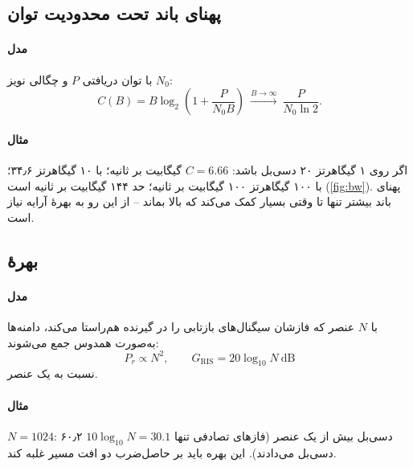 \documentclass[11pt,a4paper]{article}
\begin{document}
\begin{acnfigure}
  \caption{افت مسیر فضای آزاد (\cref{eq:fspl}).}
  \label{fig:fspl}
\end{acnfigure}

\subsection{پهنای باند تحت محدودیت توان}\label{sec:bw}
\paragraph{مدل} با توان دریافتی $P$ و چگالی نویز $N_0$:
\begin{equation}\label{eq:cap}
  C(B) = B \log_2\!\left(1 + \frac{P}{N_0 B}\right) \ \xrightarrow{B\to\infty}\ \frac{P}{N_0 \ln 2} .
\end{equation}
\paragraph{مثال} اگر  روی ۱ گیگاهرتز ۲۰ دسی‌بل باشد: $C = 6.66$ گیگابیت بر ثانیه؛ با ۱۰ گیگاهرتز ۳۴٫۶؛ با ۱۰۰ گیگاهرتز ۱۰۰ گیگابیت بر ثانیه؛ حد ۱۴۴
گیگابیت بر ثانیه است (\cref{fig:bw}). پهنای باند بیشتر تنها تا وقتی بسیار کمک می‌کند که  بالا بماند -- از این رو به بهرهٔ آرایه نیاز است.

\begin{acnfigure}
  \caption{ظرفیت بر حسب پهنای باند در توان دریافتی ثابت (\cref{eq:cap}).}
  \label{fig:bw}
\end{acnfigure}

\subsection{بهرهٔ }\label{sec:ris}
\paragraph{مدل} با $N$ عنصر که فازشان سیگنال‌های بازتابی را در گیرنده هم‌راستا می‌کند، دامنه‌ها به‌صورت همدوس جمع می‌شوند:
\begin{equation}\label{eq:ris}
  P_r \propto N^2 , \qquad G_{\mathrm{RIS}} = 20\log_{10} N \ \mathrm{dB}
\end{equation}
نسبت به یک عنصر.
\paragraph{مثال} $N = 1024$: ۶۰٫۲ دسی‌بل بیش از یک عنصر (فازهای تصادفی تنها $10\log_{10}N = 30.1$ دسی‌بل می‌دادند). این بهره باید بر حاصل‌ضرب دو افت مسیر غلبه کند.
\end{document}
